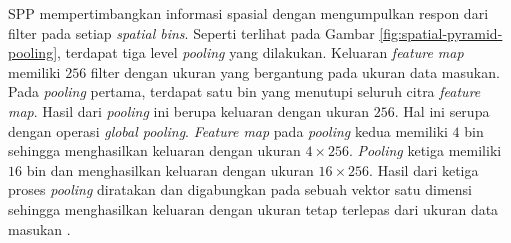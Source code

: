     SPP mempertimbangkan informasi spasial dengan mengumpulkan respon dari filter pada setiap \textit{spatial bins}. Seperti terlihat pada Gambar \ref{fig:spatial-pyramid-pooling}, terdapat tiga level \textit{pooling} yang dilakukan. Keluaran \textit{feature map} memiliki $256$ filter dengan ukuran yang bergantung pada ukuran data masukan. Pada \textit{pooling} pertama, terdapat satu bin yang menutupi seluruh citra \textit{feature map}. Hasil dari \textit{pooling} ini berupa keluaran dengan ukuran $256$. Hal ini serupa dengan operasi \textit{global pooling}. \textit{Feature map} pada \textit{pooling} kedua memiliki $4$ bin sehingga menghasilkan keluaran dengan ukuran $4\times 256$. \textit{Pooling} ketiga memiliki $16$ bin dan menghasilkan keluaran dengan ukuran $16\times 256$. Hasil dari ketiga proses \textit{pooling} diratakan dan digabungkan pada sebuah vektor satu dimensi sehingga menghasilkan keluaran dengan ukuran tetap terlepas dari ukuran data masukan \citep{He2014}.

